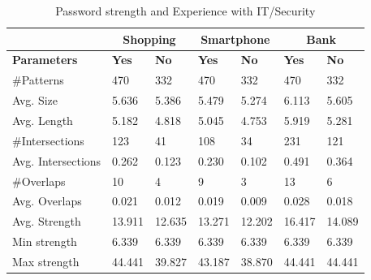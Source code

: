 		\begin{table}[H]
      \centering
      \begin{tabular}{l || l | l || l | l || l | l }
        \hline
         & \multicolumn{2}{c||}{\bf Shopping} & \multicolumn{2}{c||}{\bf Smartphone} &\multicolumn{2}{c}{\bf Bank} \\ \hline
        {\bf Parameters}   & {\bf Yes} & {\bf No} & {\bf Yes} & {\bf No} & {\bf Yes} & {\bf No}\\ \hline
        \#Patterns         & 470    & 332    & 470    & 332    & 470    & 332    \\
        Avg. Size          & 5.636  & 5.386  & 5.479  & 5.274  & 6.113  & 5.605  \\
        Avg. Length        & 5.182  & 4.818  & 5.045  & 4.753  & 5.919  & 5.281  \\
        \#Intersections    & 123    & 41     & 108    & 34     & 231    & 121    \\
        Avg. Intersections & 0.262  & 0.123  & 0.230  & 0.102  & 0.491  & 0.364  \\
        \#Overlaps         & 10     & 4      & 9      & 3      & 13     & 6      \\
        Avg. Overlaps      & 0.021  & 0.012  & 0.019  & 0.009  & 0.028  & 0.018  \\ \hline
        Avg. Strength      & 13.911 & 12.635 & 13.271 & 12.202 & 16.417 & 14.089 \\ 
        Min strength       & 6.339  & 6.339  & 6.339  & 6.339  & 6.339  & 6.339  \\
        Max strength       & 44.441 & 39.827 & 43.187 & 38.870 & 44.441 & 44.441 \\ \hline
      \end{tabular}
      \caption{Password strength and Experience with IT/Security}
      \label{tab:experiencestrength} 
    \end{table}


